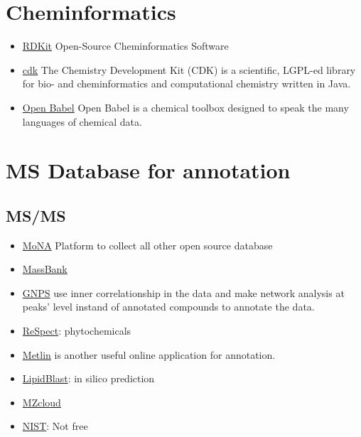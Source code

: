\documentclass[
]{book}
\providecommand{\tightlist}{%
  \setlength{\itemsep}{0pt}\setlength{\parskip}{0pt}}
\begin{document}
\hypertarget{cheminformatics}{%
\section{Cheminformatics}\label{cheminformatics}}

\begin{itemize}
\tightlist
\item
  \href{https://www.rdkit.org/}{RDKit} Open-Source Cheminformatics Software
\item
  \href{https://sourceforge.net/projects/cdk/}{cdk} The Chemistry Development Kit (CDK) is a scientific, LGPL-ed library for bio- and cheminformatics and computational chemistry written in Java.
\item
  \href{http://openbabel.org/wiki/Main_Page}{Open Babel} Open Babel is a chemical toolbox designed to speak the many languages of chemical data.
\end{itemize}

\hypertarget{ms-database-for-annotation}{%
\section{MS Database for annotation}\label{ms-database-for-annotation}}

\hypertarget{msms}{%
\subsection{MS/MS}\label{msms}}

\begin{itemize}
\item
  \href{http://mona.fiehnlab.ucdavis.edu/}{MoNA} Platform to collect all other open source database
\item
  \href{http://www.massbank.jp/?lang=en}{MassBank}
\item
  \href{https://gnps.ucsd.edu/ProteoSAFe/static/gnps-splash.jsp}{GNPS} use inner correlationship in the data and make network analysis at peaks' level instand of annotated compounds to annotate the data\citep{wang2016b}.
\item
  \href{http://spectra.psc.riken.jp/}{ReSpect}: phytochemicals
\item
  \href{https://metlin.scripps.edu/}{Metlin} is another useful online application for annotation\citep{guijas2018}.
\item
  \href{http://fiehnlab.ucdavis.edu/projects/LipidBlast}{LipidBlast}: in silico prediction
\item
  \href{https://www.mzcloud.org/}{MZcloud}
\item
  \href{https://www.nist.gov/srd/nist-standard-reference-database-1a-v17}{NIST}: Not free
\end{itemize}
\end{document}
